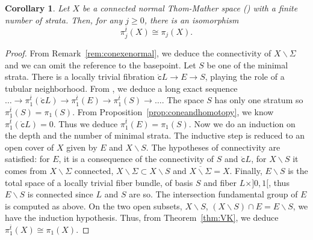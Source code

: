 \documentclass[a4paper,10pt,english,reqno]{amsart}
\theoremstyle{plain}
\newtheorem{corollary}[proposition]{Corollary}
\theoremstyle{definition}
\theoremstyle{remark}
\numberwithin{equation}{section}
\newcommand{\thmref}[1]{Theorem~\ref{#1}}
\newcommand{\propref}[1]{Proposition~\ref{#1}}
\newcommand{\remref}[1]{Remark~\ref{#1}}
\def\ov{\overline}
\def\tc{{\mathtt c}}
\def\rc{{\mathring{\tc}}}
\def\menos{\backslash}
\renewcommand\1{\hbox{\ding{192}}}
\renewcommand\2{\hbox{\ding{193}}}
\newcommand\3{\hbox{\ding{194}}}
\newcommand\4{\hbox{\ding{195}}}
\begin{document}
\begin{corollary}\label{cor:thommather}
Let $X$ be a connected normal Thom-Mather space (\cite{MR2958928}) with a finite number of strata.
%
Then, for any $j\geq 0$, there is an isomorphism
$$\pi_{j}^{\ov{t}}(X)\cong \pi_{j}(X).$$
%
\end{corollary}

\begin{proof}
From \remref{rem:conexenormal}, we deduce the connectivity of $X\menos \Sigma$ and we can omit the reference to the basepoint.
Let $S$ be one of the minimal strata. There is a locally trivial fibration
$\rc L\to E\to S$, playing the role of a tubular neighborhood.
From \cite[Theorem 2.3]{MR1404919}, we deduce a long exact sequence
$\ldots\to \pi_{1}^{\ov{t}}(\rc L)\to \pi_{1}^{\ov{t}}(E)\to \pi_{1}^{\ov{t}}(S)\to\dots$.
The space $S$ has only one stratum so $\pi_{1}^{\ov{t}}(S)=\pi_{1}(S)$.
 From \propref{prop:coneandhomotopy}, we know $\pi_{1}^{\ov{t}}(\rc L)=0$.
Thus we deduce $\pi_{1}^{\ov{t}}(E)=\pi_{1}(S)$.
Now  we do an induction on the depth and the number of minimal strata. The inductive step is reduced to an open cover of $X$ given by
$E$ and $X\menos S$. 
The hypotheses of connectivity are satisfied: 
for $E$, it is a consequence of the connectivity of $S$ and $\rc L$, 
for $X\menos S$ it comes from $X\menos \Sigma$ connected, $X\menos \Sigma\subset X\menos S$ and $\ov{X\menos \Sigma}=X$.
Finally,  $E\menos S$ is the total space of a locally trivial fiber bundle, of basis $S$ and fiber $L\times ]0,1[$, thus $E\menos S$  is connected since $L$ and $S$ are so.
%
The intersection fundamental group of  $E$ is computed as above. On the two open subsets, $X\menos S$, $(X\menos S)\cap E=E\menos S$, we have the induction hypothesis.
Thus, from \thmref{thm:VK},  we deduce  $\pi_{1}^{\ov{t}}(X)\cong \pi_{1}(X)$.


\end{proof}
\end{document}
